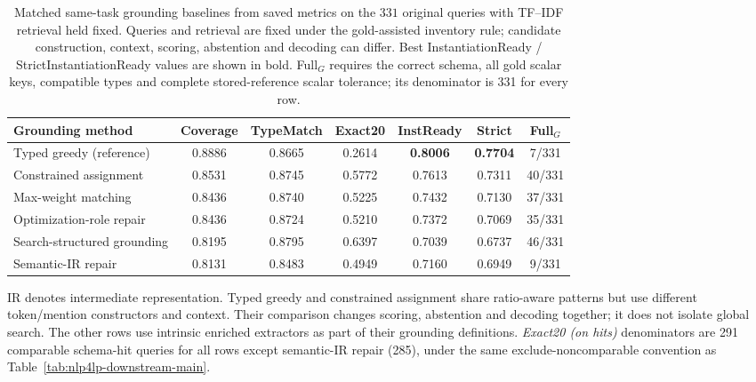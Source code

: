 \documentclass[pdflatex,iicol,sn-basic,Numbered]{sn-jnl}
\begin{document}
\begin{table}[t]
  \centering
  \renewcommand{\arraystretch}{1.18}
  \caption{Matched same-task grounding baselines from saved metrics on the $331$ original queries with TF--IDF retrieval held fixed. Queries and retrieval are fixed under the gold-assisted inventory rule; candidate construction, context, scoring, abstention and decoding can differ. Best InstantiationReady / StrictInstantiationReady values are shown in bold. Full$_G$ requires the correct schema, all gold scalar keys, compatible types and complete stored-reference scalar tolerance; its denominator is 331 for every row.}
  \label{tab:nlp4lp-grounding-baselines}
  \small
  \setlength{\tabcolsep}{2.2pt}
  \renewcommand{\arraystretch}{1.12}
  \begin{tabular}{@{}lcccccc@{}}
    \toprule
    Grounding method & Coverage & TypeMatch & Exact20 & InstReady & Strict & Full$_G$ \\
    \midrule
    Typed greedy (reference) & 0.8886 & 0.8665 & 0.2614 & \textbf{0.8006} & \textbf{0.7704} & 7/331 \\
    Constrained assignment & 0.8531 & 0.8745 & 0.5772 & 0.7613 & 0.7311 & 40/331 \\
    Max-weight matching & 0.8436 & 0.8740 & 0.5225 & 0.7432 & 0.7130 & 37/331 \\
    Optimization-role repair & 0.8436 & 0.8724 & 0.5210 & 0.7372 & 0.7069 & 35/331 \\
    Search-structured grounding & 0.8195 & 0.8795 & 0.6397 & 0.7039 & 0.6737 & 46/331 \\
    Semantic-IR repair & 0.8131 & 0.8483 & 0.4949 & 0.7160 & 0.6949 & 9/331 \\
    \bottomrule
  \end{tabular}

  \vspace{2mm}
  \raggedright
  \small
  IR denotes intermediate representation. Typed greedy and constrained assignment share ratio-aware patterns but use different token/mention constructors and context. Their comparison changes scoring, abstention and decoding together; it does not isolate global search. The other rows use intrinsic enriched extractors as part of their grounding definitions. \textit{Exact20 (on hits)} denominators are 291 comparable schema-hit queries for all rows except semantic-IR repair (285), under the same exclude-noncomparable convention as Table~\ref{tab:nlp4lp-downstream-main}.
\end{table}
\end{document}
